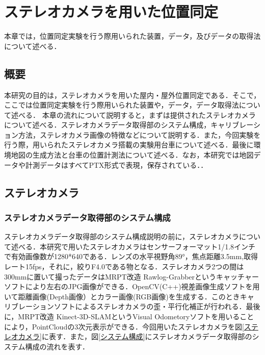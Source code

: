 \chapter{ステレオカメラを用いた位置同定}
本章では，位置同定実験を行う際用いられた装置，データ，及びデータの取得法について述べる．

\section{概要}
本研究の目的は，ステレオカメラを用いた屋内・屋外位置同定である．そこで，ここでは位置同定実験を行う際用いられた装置や，データ，データ取得法について述べる．
本章の流れについて説明すると，まずは提供されたステレオカメラについて述べる．ステレオカメラデータ取得部のシステム構成，キャリブレーション方法，ステレオカメラ画像の特徴などについて説明する．また，今回実験を行う際，用いられたステレオカメラ搭載の実験用台車について述べる．最後に環境地図の生成方法と台車の位置計測法について述べる．なお，本研究では地図データや計測データはすべてPTX形式で表現，保存されている．．
\newpage
\section{ステレオカメラ}

\subsection{ステレオカメラデータ取得部のシステム構成}
ステレオカメラデータ取得部のシステム構成説明の前に，ステレオカメラについて述べる．本研究で用いたステレオカメラはセンサーフォーマット1/1.8インチで有効画像数が1280*640である．レンズの水平視野角89°，焦点距離3.5mm,取得レート15fps，それに，絞りF4.0である物となる．ステレオカメラ2つの間は300mmに置いて撮ったデータはMRPT改造 Rawlog-Grabberというキャッチャーソフトにより左右のJPG画像ができる．OpenCV(C++)視差画像生成ソフトを用いて距離画像(Depth画像）とカラー画像(RGB画像)を生成する．このときキャリブレーションソフトによるステレオカメラの歪・平行化補正が行われる．最後に，MRPT改造 Kinect-3D-SLAMというVisual Odometoryソフトを用いることにより，PointCloudの3次元表示ができる．今回用いたステレオカメラを図{\ref{ステレオカメラ}}に表す．また，図{\ref{システム構成}}にステレオカメラデータ取得部のシステム構成の流れを表す．

